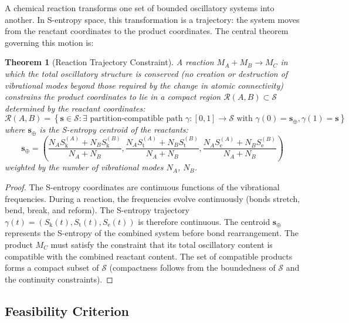 \documentclass[11pt,twocolumn,a4paper]{article}
\newtheorem{theorem}{Theorem}[section]
\theoremstyle{definition}
\theoremstyle{remark}
\newcommand{\Sk}{S_{\mathrm{k}}}
\newcommand{\St}{S_{\mathrm{t}}}
\newcommand{\Se}{S_{\mathrm{e}}}
\newcommand{\Sspace}{\mathcal{S}}
\begin{document}
A chemical reaction transforms one set of bounded oscillatory systems into another. In S-entropy space, this transformation is a trajectory: the system moves from the reactant coordinates to the product coordinates. The central theorem governing this motion is:

\begin{theorem}[Reaction Trajectory Constraint]
\label{thm:reaction_trajectory}
A reaction $M_A + M_B \to M_C$ in which the total oscillatory structure is conserved (no creation or destruction of vibrational modes beyond those required by the change in atomic connectivity) constrains the product coordinates to lie in a compact region $\mathcal{R}(A, B) \subset \Sspace$ determined by the reactant coordinates:
\begin{equation}
\mathcal{R}(A, B) = \left\{ \mathbf{s} \in \Sspace : \exists \text{ partition-compatible path } \gamma: [0,1] \to \Sspace \text{ with } \gamma(0) = \mathbf{s}_{\oplus}, \gamma(1) = \mathbf{s} \right\}
\label{eq:reaction_region}
\end{equation}
where $\mathbf{s}_{\oplus}$ is the S-entropy centroid of the reactants:
\begin{equation}
\mathbf{s}_{\oplus} = \left( \frac{N_A \Sk^{(A)} + N_B \Sk^{(B)}}{N_A + N_B}, \frac{N_A \St^{(A)} + N_B \St^{(B)}}{N_A + N_B}, \frac{N_A \Se^{(A)} + N_B \Se^{(B)}}{N_A + N_B} \right)
\label{eq:centroid}
\end{equation}
weighted by the number of vibrational modes $N_A$, $N_B$.
\end{theorem}

\begin{proof}
The S-entropy coordinates are continuous functions of the vibrational frequencies. During a reaction, the frequencies evolve continuously (bonds stretch, bend, break, and reform). The S-entropy trajectory $\gamma(t) = (\Sk(t), \St(t), \Se(t))$ is therefore continuous. The centroid $\mathbf{s}_{\oplus}$ represents the S-entropy of the combined system before bond rearrangement. The product $M_C$ must satisfy the constraint that its total oscillatory content is compatible with the combined reactant content. The set of compatible products forms a compact subset of $\Sspace$ (compactness follows from the boundedness of $\Sspace$ and the continuity constraints).
\end{proof}

\subsection{Feasibility Criterion}
\end{document}
